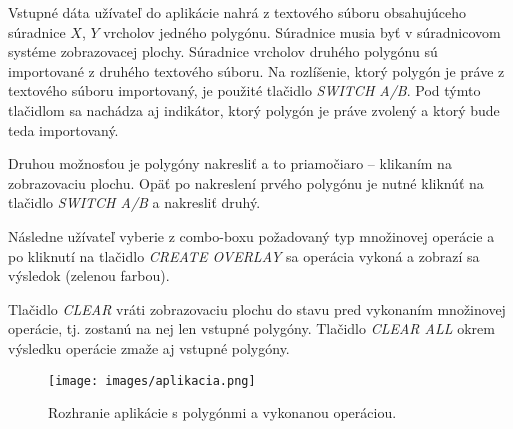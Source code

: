\documentclass[11pt]{article}
\begin{document}
Vstupné dáta užívateľ do aplikácie nahrá z textového súboru obsahujúceho súradnice $X$, $Y$ \linebreak vrcholov jedného polygónu. Súradnice musia byť v súradnicovom systéme zobrazovacej plochy. Súradnice vrcholov druhého polygónu sú importované z druhého textového súboru. Na rozlíšenie, ktorý polygón je práve z textového súboru importovaný, je použité tlačidlo \textit{SWITCH A/B}. Pod týmto tlačidlom sa nachádza aj indikátor, ktorý polygón je práve zvolený a ktorý bude teda importovaný.

\noindent Druhou možnosťou je polygóny nakresliť a to priamočiaro -- klikaním na zobrazovaciu plochu. Opäť po nakreslení prvého polygónu je nutné kliknúť na tlačidlo \textit{SWITCH A/B} a nakresliť druhý.

Následne užívateľ vyberie z combo-boxu požadovaný typ množinovej operácie a po kliknutí na tlačidlo \textit{CREATE OVERLAY} sa operácia vykoná a zobrazí sa výsledok (zelenou farbou).

Tlačidlo \textit{CLEAR} vráti zobrazovaciu plochu do stavu pred vykonaním množinovej operácie, tj. zostanú na nej len vstupné polygóny. Tlačidlo \textit{CLEAR ALL} okrem výsledku operácie zmaže aj vstupné polygóny.

\begin{figure}[h]
\captionsetup{justification=centering}
\centering
\texttt{[image: images/aplikacia.png]}
\caption{Rozhranie aplikácie s polygónmi a vykonanou operáciou.}
\label{fig:obr1}
\end{figure}
\end{document}
